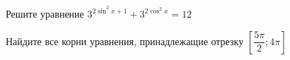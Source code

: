 \begin{ex}
	\begin{condition}
		\begin{enumcols}[label=\asbuk*)]
			\item Решите уравнение \( 3^{2\sin^2 x + 1} + 3^{2\cos^2 x} =12 \)
			\item Найдите все корни уравнения, принадлежащие отрезку \( \left[\dfrac{5\pi}{2};4\pi\right] \)
		\end{enumcols}
	\end{condition}
\end{ex}